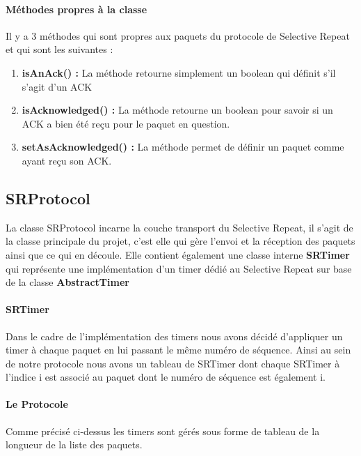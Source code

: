 \documentclass[../rapport.tex]{subfiles}
\begin{document}
	\paragraph{Méthodes propres à la classe}
	Il y a 3 méthodes qui sont propres aux paquets du protocole de Selective Repeat et qui sont
	les suivantes :
	\begin{enumerate}
		\item\textbf{isAnAck() : } La méthode retourne simplement un boolean qui définit s'il 
			s'agit d'un ACK
		\item\textbf{isAcknowledged() : } La méthode retourne un boolean pour savoir si un ACK
			a bien été reçu pour le paquet en question.
		\item\textbf{setAsAcknowledged() : } La méthode permet de définir un paquet comme ayant
			reçu son ACK.
	\end{enumerate}

\subsection{SRProtocol}

	La classe SRProtocol incarne la couche transport du Selective Repeat, il s'agit de la classe
	principale du projet, c'est elle qui gère l'envoi et la réception des paquets ainsi que ce
	qui en découle.	Elle contient également une classe interne \textbf{SRTimer} qui représente
	une implémentation d'un timer dédié au Selective Repeat sur base de la classe 
	\textbf{AbstractTimer}

	\paragraph{SRTimer} Dans le cadre de l'implémentation des timers nous avons décidé
	d'appliquer un timer à chaque paquet en lui passant le même numéro de séquence. 
	Ainsi au sein de notre protocole nous avons un tableau de SRTimer dont chaque SRTimer
	à l'indice i est associé au paquet dont le numéro de séquence est également i.

	\paragraph{Le Protocole} Comme précisé ci-dessus les timers sont gérés sous forme de tableau
	de la longueur de la liste des paquets. 

	\medskip
\end{document}

